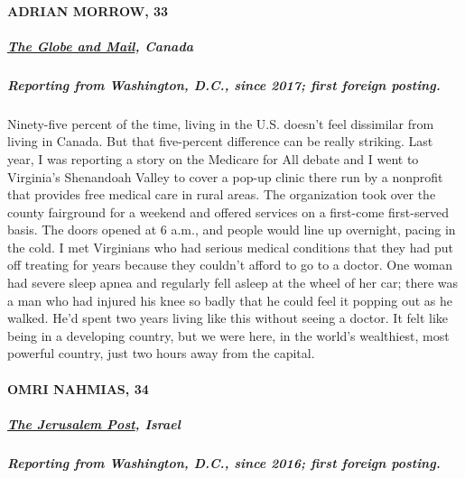 \hypertarget{adrian-morrow-33}{%
\paragraph{ADRIAN MORROW, 33}\label{adrian-morrow-33}}

\hypertarget{the-globe-and-mail-canada}{%
\subparagraph{\texorpdfstring{\textbf{\href{https://www.theglobeandmail.com/}{The
Globe and Mail},
Canada}}{The Globe and Mail, Canada}}\label{the-globe-and-mail-canada}}

\hypertarget{reporting-from-washington-dc-since-2017-first-foreign-posting-2}{%
\subparagraph{\texorpdfstring{\textbf{Reporting from Washington, D.C.,
since 2017; first foreign
posting.}}{Reporting from Washington, D.C., since 2017; first foreign posting.}}\label{reporting-from-washington-dc-since-2017-first-foreign-posting-2}}

Ninety-five percent of the time, living in the U.S. doesn't feel
dissimilar from living in Canada. But that five-percent difference can
be really striking. Last year, I was reporting a story on the Medicare
for All debate and I went to Virginia's Shenandoah Valley to cover a
pop-up clinic there run by a nonprofit that provides free medical care
in rural areas. The organization took over the county fairground for a
weekend and offered services on a first-come first-served basis. The
doors opened at 6 a.m., and people would line up overnight, pacing in
the cold. I met Virginians who had serious medical conditions that they
had put off treating for years because they couldn't afford to go to a
doctor. One woman had severe sleep apnea and regularly fell asleep at
the wheel of her car; there was a man who had injured his knee so badly
that he could feel it popping out as he walked. He'd spent two years
living like this without seeing a doctor. It felt like being in a
developing country, but we were here, in the world's wealthiest, most
powerful country, just two hours away from the capital.

\hypertarget{omri-nahmias-34}{%
\paragraph{OMRI NAHMIAS, 34}\label{omri-nahmias-34}}

\hypertarget{the-jerusalem-post-israel}{%
\subparagraph{\texorpdfstring{\textbf{\href{https://www.jpost.com/}{The
Jerusalem Post},
Israel}}{The Jerusalem Post, Israel}}\label{the-jerusalem-post-israel}}

\hypertarget{reporting-from-washington-dc-since-2016-first-foreign-posting-1}{%
\subparagraph{\texorpdfstring{\textbf{Reporting from Washington, D.C.,
since 2016; first foreign
posting.}}{Reporting from Washington, D.C., since 2016; first foreign posting.}}\label{reporting-from-washington-dc-since-2016-first-foreign-posting-1}}

